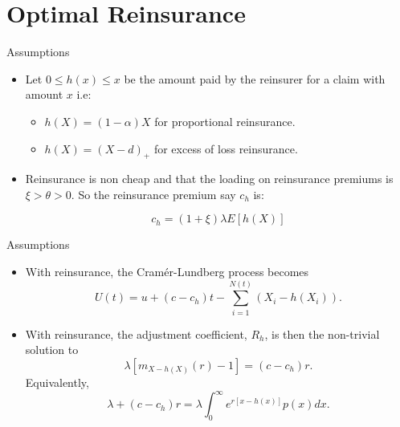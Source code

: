 \documentclass[11pt]{beamer}
\begin{document}
\section{Optimal Reinsurance}
\begin{frame}{Assumptions}

\begin{itemize}

\item Let $0\le h(x) \le x$ be the amount paid by the reinsurer for a claim with amount $x$ i.e:

\begin{itemize}
\item $h(X)=(1-\alpha)X$ for proportional reinsurance.

\item $h(X)=(X-d)_+$ for excess of loss reinsurance.
\end{itemize}

\vfill

\item Reinsurance is non cheap and that the loading on reinsurance premiums is $\xi>\theta > 0$. So the reinsurance premium say $c_{h}$ is:

$$c_h=(1+\xi)\lambda E[h(X)]$$



\end{itemize}

\end{frame}
\begin{frame}{Assumptions}

\begin{itemize}

\item With reinsurance, the Cram\'er-Lundberg process  becomes
$$U(t)=u+(c-c_h)t-\sum_{i=1}^{N(t)} (X_i-h(X_i)).$$

\vfill

\item With
reinsurance, the adjustment coefficient, $R_{h}$, is then the non-trivial
solution to
$$\lambda \left[ m_{X-h(X)}(r)-1\right]=(c-c_h)r.$$
Equivalently,
$$\lambda +\left( c-c_{h}\right) r=\lambda \int_{0}^{\infty }e^{r\left[x-h\left( x\right) \right] }p\left( x\right) dx.$$

\end{itemize}

\end{frame}
\end{document}
